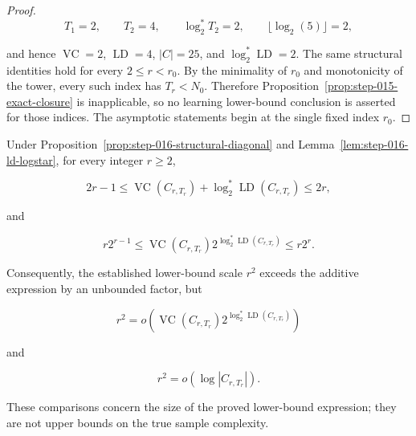 \begin{proof}
\[
T_1=2,\qquad T_2=4,\qquad \log_2^*T_2=2,\qquad
\lfloor\log_2(5)\rfloor=2,
\]

and hence \(\operatorname{VC}=2\), \(\operatorname{LD}=4\),
\(|C|=25\), and \(\log_2^*\operatorname{LD}=2\). The same structural
identities hold for every \(2\le r<r_0\). By the minimality of \(r_0\)
and monotonicity of the tower, every such index has \(T_r<N_0\). Therefore
Proposition~\ref{prop:step-015-exact-closure} is inapplicable, so no learning
lower-bound conclusion is asserted for those indices. The asymptotic statements begin
at the single fixed index \(r_0\). \end{proof}

\begin{proposition}\label{prop:step-016-scale-comparison}
Under Proposition~\ref{prop:step-016-structural-diagonal} and
Lemma~\ref{lem:step-016-ld-logstar}, for every integer \(r\ge2\),

\[
2r-1
\le
\operatorname{VC}(C_{r,T_r})
+\log_2^*\operatorname{LD}(C_{r,T_r})
\le2r,
\tag{S16.16}\label{eq:step-016-16}
\]

and

\[
r2^{r-1}
\le
\operatorname{VC}(C_{r,T_r})
2^{\log_2^*\operatorname{LD}(C_{r,T_r})}
\le r2^r.
\tag{S16.17}\label{eq:step-016-17}
\]

Consequently, the established lower-bound scale \(r^2\) exceeds the
additive expression by an unbounded factor, but

\[
r^2
=o\!\left(
\operatorname{VC}(C_{r,T_r})
2^{\log_2^*\operatorname{LD}(C_{r,T_r})}
\right)
\tag{S16.18}\label{eq:step-016-18}
\]

and

\[
r^2=o(\log|C_{r,T_r}|).
\tag{S16.19}\label{eq:step-016-19}
\]

These comparisons concern the size of the proved lower-bound expression;
they are not upper bounds on the true sample complexity.
\end{proposition}

